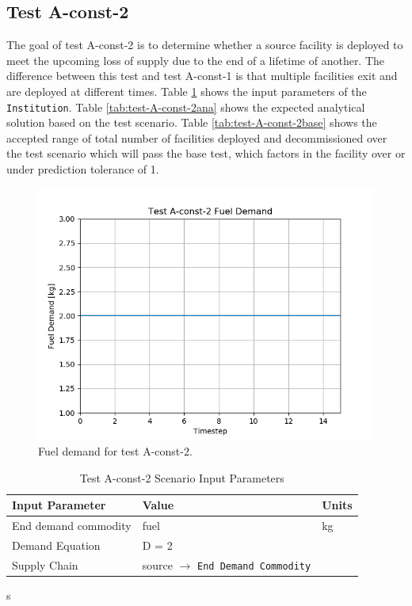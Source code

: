 \documentclass[11pt,letterpaper]{article}
\begin{document}
\subsection{Test A-const-2}
The goal of test A-const-2 is to determine whether a source facility is deployed
to meet the upcoming loss of supply due to the end of a lifetime of another.
The difference between this test and test A-const-1 is that multiple facilities
exit and are deployed at different times.
Table \ref{tab:test-A-const-2} shows the input parameters of the \texttt{Institution}. Table \ref{tab:test-A-const-2ana} shows the expected analytical solution based on the test scenario. Table \ref{tab:test-A-const-2base} shows the accepted range of total number of facilities deployed and decommissioned over the test scenario which will pass the base test, which factors in the facility over or under prediction tolerance of 1.

\begin{figure}[H]
	\begin{center}
		\includegraphics[scale=0.7]{./images/A-const-2.png}
	\end{center}
        \caption{Fuel demand for test A-const-2.}
	\label{fig:A-dep-2}
\end{figure}

\begin{table}[H]
	\centering
	\caption{Test A-const-2 Scenario Input Parameters }
	\label{tab:test-A-const-2}
	\begin{tabular}{|l|l|l|}
		\hline
		\textbf{Input Parameter} & \textbf{Value} & \textbf{Units} \\
		\hline
		End demand commodity & fuel & kg \\
		Demand Equation & D = 2 & \\
		Supply Chain & source $\rightarrow$ \texttt{End Demand Commodity} &  \\
		\hline
	\end{tabular}
\end{table}s
\end{document}
